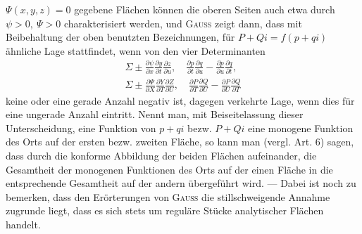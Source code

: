 \(\Psi(x,y,z)=0\) gegebene Flächen können die oberen Seiten auch etwa durch
\(\psi>0,\ \Psi>0\) charakterisiert werden, und \textsc{Gauss} zeigt dann, dass mit Beibehaltung
der oben benutzten Bezeichnungen, für \(P+Qi=f(p+qi)\) ähnliche
Lage stattfindet, wenn von den vier Determinanten
\[
\begin{gathered}
\Sigma\pm\frac{\partial\psi}{\partial x}\frac{\partial y}{\partial t}\frac{\partial z}{\partial u},\quad
\frac{\partial p}{\partial t}\frac{\partial q}{\partial u}-\frac{\partial p}{\partial u}\frac{\partial q}{\partial t},\\
\Sigma\pm\frac{\partial\Psi}{\partial X}\frac{\partial Y}{\partial T}\frac{\partial Z}{\partial U},\quad
\frac{\partial P}{\partial T}\frac{\partial Q}{\partial U}-\frac{\partial P}{\partial U}\frac{\partial Q}{\partial T}
\end{gathered}
\]
keine oder eine gerade Anzahl negativ ist, dagegen verkehrte Lage, wenn
dies für eine ungerade Anzahl eintritt. Nennt man, mit Beiseitelassung dieser
Unterscheidung, eine Funktion von \(p+qi\) bezw. \(P+Qi\) eine monogene Funktion
des Orts auf der ersten bezw. zweiten Fläche, so kann man (vergl. Art. 6)
sagen, dass durch die konforme Abbildung der beiden Flächen aufeinander,
die Gesamtheit der monogenen Funktionen des Orts auf der einen Fläche in
die entsprechende Gesamtheit auf der andern übergeführt wird. — Dabei ist
noch zu bemerken, dass den Erörterungen von \textsc{Gauss} die stillschweigende Annahme
zugrunde liegt, dass es sich stets um reguläre Stücke analytischer
Flächen handelt.

